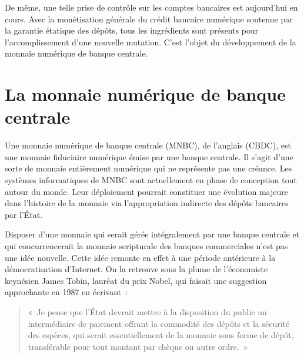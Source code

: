 De même, une telle prise de contrôle sur les comptes bancaires est aujourd'hui en cours. Avec la monétisation générale du crédit bancaire numérique soutenue par la garantie étatique des dépôts, tous les ingrédients sont présents pour l'accomplissement d'une nouvelle mutation. C'est l'objet du développement de la monnaie numérique de banque centrale.

\section*{La monnaie numérique de banque centrale}

Une monnaie numérique de banque centrale (MNBC), de l'anglais  (CBDC), est une monnaie fiduciaire numérique émise par une banque centrale. Il s'agit d'une sorte de monnaie entièrement numérique qui ne représente pas une créance. Les systèmes informatiques de MNBC sont actuellement en phase de conception tout autour du monde. Leur déploiement pourrait constituer une évolution majeure dans l'histoire de la monnaie via l'appropriation indirecte des dépôts bancaires par l'État.


Disposer d'une monnaie qui serait gérée intégralement par une banque centrale et qui concurrencerait la monnaie scripturale des banques commerciales n'est pas une idée nouvelle. Cette idée remonte en effet à une période antérieure à la démocratisation d'Internet. On la retrouve sous la plume de l'économiste keynésien James Tobin, lauréat du prix Nobel, qui faisait une suggestion approchante en 1987 en écrivant~:

\begin{quote}
«~Je pense que l'État devrait mettre à la disposition du public un intermédiaire de paiement offrant la commodité des dépôts et la sécurité des espèces, qui serait essentiellement de la monnaie sous forme de dépôt, transférable pour tout montant par chèque ou autre ordre.~»
\end{quote} %

